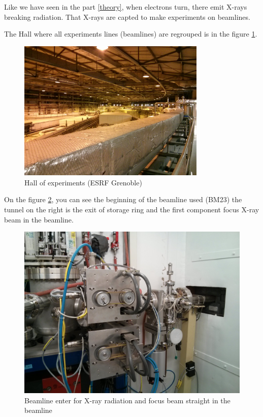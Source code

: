 \documentclass[11pt,a4paper,oneside]{article}
\begin{document}
Like we have seen in the part \ref{theory}, when electrons turn, there emit X-rays breaking radiation. That X-rays are capted to make experiments on beamlines.\medskip


The Hall where all experiments lines (beamlines) are regrouped is in the figure \ref{Hall}.\medskip

\begin{figure}[H]
    \begin{center}
        \includegraphics[width=0.8\textwidth]{Images/IMG_20151210_213319.jpg}
        \caption{Hall of experiments (ESRF Grenoble)}
        \label{Hall}
    \end{center}
\end{figure}
\medskip

On the figure \ref{Incident}, you can see the beginning of the beamline used (BM23) the tunnel on the right is the exit of storage ring and the first component focus X-ray beam in the beamline.


\begin{figure}[H]
    \begin{center}
        \includegraphics[scale=0.13]{Images/IMG_20151210_202655.jpg}
        \caption{Beamline enter for X-ray radiation and focus beam straight in the beamline}
        \label{Incident}
    \end{center}
\end{figure}
\medskip
\end{document}
